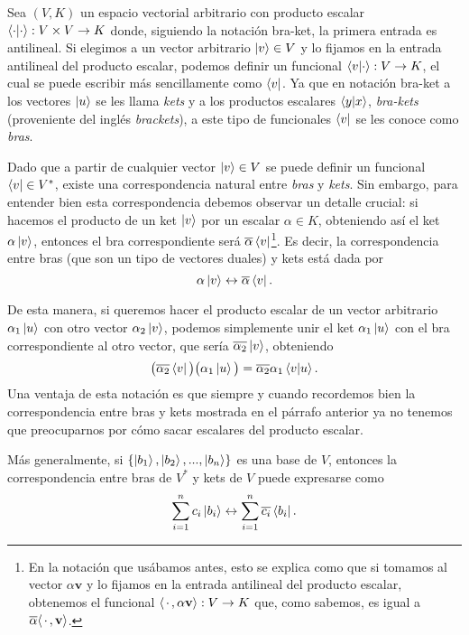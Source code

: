 \documentclass[12pt,libertine]{book}
\begin{document}
Sea $(V,K)$ un espacio vectorial arbitrario con producto escalar $\braket{\cdot|\cdot}:V\times V\to K$ donde, siguiendo la notación bra-ket, la primera entrada es antilineal. Si elegimos a un vector arbitrario $\ket{v}\in V$ y lo fijamos en la entrada antilineal del producto escalar, podemos definir un funcional $\braket{v|\cdot}:V\to K$, el cual se puede escribir más sencillamente como $\bra{v}$. Ya que en notación bra-ket a los vectores $\ket{u}$ se les llama \emph{kets} y a los productos escalares $\braket{y|x}$, \emph{bra-kets} (proveniente del inglés \emph{brackets}), a este tipo de funcionales $\bra{v}$ se les conoce como \emph{bras}.

Dado que a partir de cualquier vector $\ket{v}\in V$ se puede definir un funcional $\bra{v}\in V^*$, existe una correspondencia natural entre \emph{bras} y \emph{kets}. Sin embargo, para entender bien esta correspondencia debemos observar un detalle crucial: si hacemos el producto de un ket $\ket{v}$ por un escalar $\alpha\in K$, obteniendo así el ket $\alpha\ket{v}$, entonces el bra correspondiente será $\overline{\alpha}\bra{v}$\footnote{En la notación que usábamos antes, esto se explica como que si tomamos al vector $\alpha\mathbf{v}$ y lo fijamos en la entrada antilineal del producto escalar, obtenemos el funcional $\langle\hspace{0.5mm}\cdot\hspace{0.5mm} , \alpha\mathbf{v}\rangle:V\to K$ que, como sabemos, es igual a $\overline{\alpha}\langle\hspace{0.5mm} \cdot\hspace{0.5mm} ,\mathbf{v}\rangle$.}. Es decir, la correspondencia entre bras (que son un tipo de vectores duales) y kets está dada por \[
    \alpha\ket{v} \leftrightarrow \overline{\alpha}\bra{v}
.\] 

De esta manera, si queremos hacer el producto escalar de un vector arbitrario $\alpha_1 \ket{u}$ con otro vector $\alpha_2 \ket{v}$, podemos simplemente unir el ket $\alpha_1 \ket{u}$ con el bra correspondiente al otro vector, que sería $\overline{\alpha_2}\ket{v}$, obteniendo \[
    \big(\overline{\alpha_2}\bra{v}\big)\big(\alpha_1\ket{u}\big) = \overline{\alpha_2}\alpha_1\braket{v|u}
.\] Una ventaja de esta notación es que \textemdash siempre y cuando recordemos bien la correspondencia entre bras y kets mostrada en el párrafo anterior\textemdash\hspace{0.5mm} ya no tenemos que preocuparnos por cómo sacar escalares del producto escalar.

Más generalmente, si $\{\ket{b_1},\ket{b_2},...,\ket{b_n}\}$ es una base de $V$, entonces la correspondencia entre bras de $V^*$ y kets de $V$ puede expresarse como \[
    \sum_{i=1}^n c_i \ket{b_i} \leftrightarrow \sum_{i=1}^n \overline{c_i}\bra{b_i}
.\]    
\end{document}
